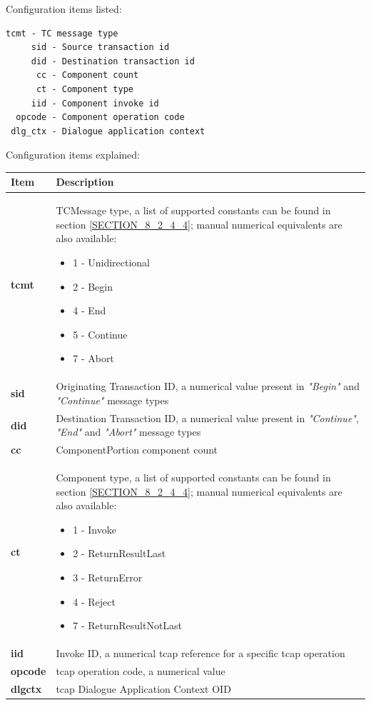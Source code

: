\documentclass[a4paper,latin]{paper}
\begin{document}
\noindent{}Configuration items listed:
\begin{lstlisting}[style=BashInputStyle, belowskip=\baselineskip]
    tcmt - TC message type
     sid - Source transaction id
     did - Destination transaction id
      cc - Component count           
      ct - Component type 
     iid - Component invoke id
  opcode - Component operation code
 dlg_ctx - Dialogue application context
\end{lstlisting}
\noindent{}Configuration items explained:\\
\begin{tabularx}{\textwidth}{ | l | X |}
	\hline
	Item	 				& Description \\
	\hline
	\textbf{tcmt}				& TCMessage type, a list of supported constants can be found in
                                                  section \ref{SECTION_8_2_4_4}; manual numerical equivalents are also available:
 						  \begin{itemize}
							\setlength{\itemsep}{0pt}
							\setlength{\parskip}{0pt}
							\setlength{\parsep}{0pt}
							\item 1 - Unidirectional
							\item 2 - Begin
							\item 4 - End
							\item 5 - Continue
							\item 7 - Abort
						  \end{itemize} \\ 
	\textbf{sid}				& Originating Transaction ID, a numerical value present in \textit{"Begin"} and \textit{"Continue"} message types \\ 
	\textbf{did}				& Destination Transaction ID, a numerical value present in \textit{"Continue"}, \textit{"End"} and \textit{"Abort"}
						  message types \\ 
	\textbf{cc}				& ComponentPortion component count \\ 
	\textbf{ct}				& Component type,  a list of supported constants can be found in
                                                  section \ref{SECTION_8_2_4_4}; manual numerical equivalents are also available: 
 						  \begin{itemize}
							\setlength{\itemsep}{0pt}
							\setlength{\parskip}{0pt}
							\setlength{\parsep}{0pt}
							\item 1 - Invoke
							\item 2 - ReturnResultLast
							\item 3 - ReturnError
							\item 4 - Reject
							\item 7 - ReturnResultNotLast
						  \end{itemize} \\ 
	\textbf{iid}				& Invoke ID, a numerical \acrshort{tcap} reference for a specific \acrshort{tcap} operation \\ 
	\textbf{opcode}				& \acrshort{tcap} operation code, a numerical value \\ 
	\textbf{dlg\textunderscore{}ctx}	& \acrshort{tcap} Dialogue Application Context OID\\ 
	\hline
\end{tabularx}\\
\end{document}
